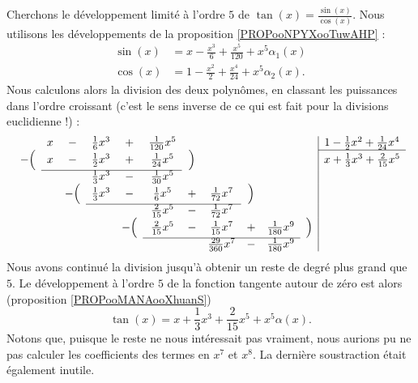 \begin{example}
	Cherchons le développement limité à l'ordre \( 5\) de \( \tan(x)=\frac{ \sin(x) }{ \cos(x) }\). Nous utilisons les développements de la proposition \ref{PROPooNPYXooTuwAHP} :
	\begin{subequations}
		\begin{align}
			\sin(x) & =x-\frac{ x^3 }{ 6 }+\frac{ x^5 }{ 120 }+x^5\alpha_1(x) \\
			\cos(x) & =1-\frac{ x^2 }{ 2 }+\frac{ x^4 }{ 24 }+x^5\alpha_2(x).
		\end{align}
	\end{subequations}
	Nous calculons alors la division des deux polynômes, en classant les puissances dans l'ordre croissant (c'est le sens inverse de ce qui est fait pour la divisions euclidienne !) :
	\begin{equation*}
		\begin{array}[]{ccccccccccc|c}
			       & x & -      & \frac{1}{ 6 }x^3 & +      & \frac{1}{ 120 }x^5  &       &                       &       &                    &       & 1-\frac{ 1 }{2}x^2+\frac{1}{ 24 }x^4   \\
			\cline{12-12}
			-\Big( & x & -      & \frac{ 1 }{2}x^3 & +      & \frac{1}{ 24 }x^5   & \Big) &                       &       &                    &       & x+\frac{1}{ 3 }x^3+\frac{ 2 }{ 15 }x^5 \\
			\cline{2-6}
			       &   &        & \frac{1}{ 3 }x^3 & -      & \frac{1}{ 30 }x^5   &       &                       &       &                    &       &                                        \\
			       &   & -\Big( & \frac{1}{ 3 }x^3 & -      & \frac{1}{ 6 }x^5    & +     & \frac{1}{ 72 }x^7     & \Big) &                    &                                                \\
			\cline{4-8}
			       &   &        &                  &        & \frac{ 2 }{ 15 }x^5 & -     & \frac{1}{ 72 }x^7     &       &                    &                                                \\
			       &   &        &                  & -\Big( & \frac{ 2 }{ 15 }x^5 & -     & \frac{1}{ 15 }x^7     & +     & \frac{1}{ 180 }x^9 & \Big) &                                        \\
			\cline{6-10}
			       &   &        &                  &        &                     &       & \frac{ 29 }{ 360 }x^7 & -     & \frac{1}{ 180 }x^9 &       &                                        \\
		\end{array}
	\end{equation*}
	Nous avons continué la division jusqu'à obtenir un reste de degré plus grand que \( 5\). Le développement à l'ordre \( 5\) de la fonction tangente autour de zéro est alors (proposition \ref{PROPooMANAooXhuanS})
	\begin{equation}
		\tan(x)=x+\frac{1}{ 3 }x^3+\frac{ 2 }{ 15 }x^5+x^5\alpha(x).
	\end{equation}
	Notons que, puisque le reste ne nous intéressait pas vraiment, nous aurions pu ne pas calculer les coefficients des termes en \( x^7\) et \( x^8\). La dernière soustraction était également inutile.
\end{example}


